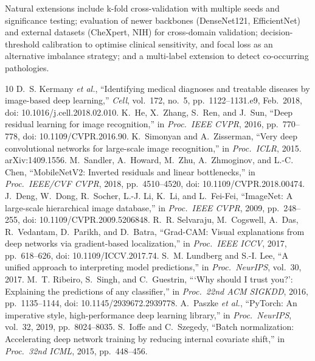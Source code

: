 \documentclass[11pt,a4paper]{article}
\numberwithin{figure}{section}
\numberwithin{table}{section}
\begin{document}
Natural extensions include k-fold cross-validation with multiple seeds and
significance testing; evaluation of newer backbones (DenseNet121, EfficientNet) and external datasets
(CheXpert, NIH) for cross-domain validation; decision-threshold calibration to optimise clinical
sensitivity, and focal loss as an alternative imbalance strategy; and a multi-label extension to detect
co-occurring pathologies.

\clearpage
{}
{}
\begin{thebibliography}{10}
 D.~S. Kermany \textit{et al.}, ``Identifying medical diagnoses and treatable diseases by image-based deep learning,'' \textit{Cell}, vol.~172, no.~5, pp.~1122--1131.e9, Feb.\ 2018, doi: 10.1016/j.cell.2018.02.010.
 K.~He, X.~Zhang, S.~Ren, and J.~Sun, ``Deep residual learning for image recognition,'' in \textit{Proc.\ IEEE CVPR}, 2016, pp.~770--778, doi: 10.1109/CVPR.2016.90.
 K.~Simonyan and A.~Zisserman, ``Very deep convolutional networks for large-scale image recognition,'' in \textit{Proc.\ ICLR}, 2015. arXiv:1409.1556.
 M.~Sandler, A.~Howard, M.~Zhu, A.~Zhmoginov, and L.-C. Chen, ``MobileNetV2: Inverted residuals and linear bottlenecks,'' in \textit{Proc.\ IEEE/CVF CVPR}, 2018, pp.~4510--4520, doi: 10.1109/CVPR.2018.00474.
 J.~Deng, W.~Dong, R.~Socher, L.-J. Li, K.~Li, and L.~Fei-Fei, ``ImageNet: A large-scale hierarchical image database,'' in \textit{Proc.\ IEEE CVPR}, 2009, pp.~248--255, doi: 10.1109/CVPR.2009.5206848.
 R.~R. Selvaraju, M.~Cogswell, A.~Das, R.~Vedantam, D.~Parikh, and D.~Batra, ``Grad-CAM: Visual explanations from deep networks via gradient-based localization,'' in \textit{Proc.\ IEEE ICCV}, 2017, pp.~618--626, doi: 10.1109/ICCV.2017.74.
 S.~M. Lundberg and S.-I. Lee, ``A unified approach to interpreting model predictions,'' in \textit{Proc.\ NeurIPS}, vol.~30, 2017.
 M.~T. Ribeiro, S.~Singh, and C.~Guestrin, ```Why should I trust you?': Explaining the predictions of any classifier,'' in \textit{Proc.\ 22nd ACM SIGKDD}, 2016, pp.~1135--1144, doi: 10.1145/2939672.2939778.
 A.~Paszke \textit{et al.}, ``PyTorch: An imperative style, high-performance deep learning library,'' in \textit{Proc.\ NeurIPS}, vol.~32, 2019, pp.~8024--8035.
 S.~Ioffe and C.~Szegedy, ``Batch normalization: Accelerating deep network training by reducing internal covariate shift,'' in \textit{Proc.\ 32nd ICML}, 2015, pp.~448--456.
\end{thebibliography}
\appendix
\end{document}
